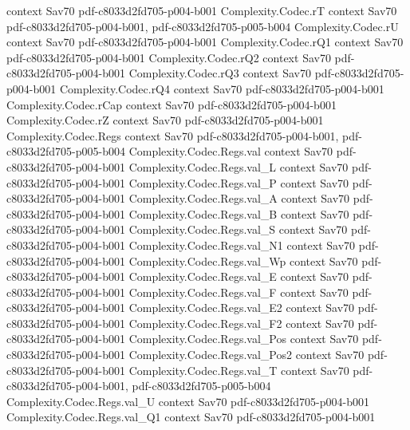 \begin{theorem}
  {context}
  {Sav70}
  {pdf-c8033d2fd705-p004-b001}
\proofstep
  {Complexity.Codec.rT}
  {context}
  {Sav70}
  {pdf-c8033d2fd705-p004-b001,
    pdf-c8033d2fd705-p005-b004}
\proofstep
  {Complexity.Codec.rU}
  {context}
  {Sav70}
  {pdf-c8033d2fd705-p004-b001}
\proofstep
  {Complexity.Codec.rQ1}
  {context}
  {Sav70}
  {pdf-c8033d2fd705-p004-b001}
\proofstep
  {Complexity.Codec.rQ2}
  {context}
  {Sav70}
  {pdf-c8033d2fd705-p004-b001}
\proofstep
  {Complexity.Codec.rQ3}
  {context}
  {Sav70}
  {pdf-c8033d2fd705-p004-b001}
\proofstep
  {Complexity.Codec.rQ4}
  {context}
  {Sav70}
  {pdf-c8033d2fd705-p004-b001}
\proofstep
  {Complexity.Codec.rCap}
  {context}
  {Sav70}
  {pdf-c8033d2fd705-p004-b001}
\proofstep
  {Complexity.Codec.rZ}
  {context}
  {Sav70}
  {pdf-c8033d2fd705-p004-b001}
\proofstep
  {Complexity.Codec.Regs}
  {context}
  {Sav70}
  {pdf-c8033d2fd705-p004-b001,
    pdf-c8033d2fd705-p005-b004}
\proofstep
  {Complexity.Codec.Regs.val}
  {context}
  {Sav70}
  {pdf-c8033d2fd705-p004-b001}
\proofstep
  {Complexity.Codec.Regs.val_L}
  {context}
  {Sav70}
  {pdf-c8033d2fd705-p004-b001}
\proofstep
  {Complexity.Codec.Regs.val_P}
  {context}
  {Sav70}
  {pdf-c8033d2fd705-p004-b001}
\proofstep
  {Complexity.Codec.Regs.val_A}
  {context}
  {Sav70}
  {pdf-c8033d2fd705-p004-b001}
\proofstep
  {Complexity.Codec.Regs.val_B}
  {context}
  {Sav70}
  {pdf-c8033d2fd705-p004-b001}
\proofstep
  {Complexity.Codec.Regs.val_S}
  {context}
  {Sav70}
  {pdf-c8033d2fd705-p004-b001}
\proofstep
  {Complexity.Codec.Regs.val_N1}
  {context}
  {Sav70}
  {pdf-c8033d2fd705-p004-b001}
\proofstep
  {Complexity.Codec.Regs.val_Wp}
  {context}
  {Sav70}
  {pdf-c8033d2fd705-p004-b001}
\proofstep
  {Complexity.Codec.Regs.val_E}
  {context}
  {Sav70}
  {pdf-c8033d2fd705-p004-b001}
\proofstep
  {Complexity.Codec.Regs.val_F}
  {context}
  {Sav70}
  {pdf-c8033d2fd705-p004-b001}
\proofstep
  {Complexity.Codec.Regs.val_E2}
  {context}
  {Sav70}
  {pdf-c8033d2fd705-p004-b001}
\proofstep
  {Complexity.Codec.Regs.val_F2}
  {context}
  {Sav70}
  {pdf-c8033d2fd705-p004-b001}
\proofstep
  {Complexity.Codec.Regs.val_Pos}
  {context}
  {Sav70}
  {pdf-c8033d2fd705-p004-b001}
\proofstep
  {Complexity.Codec.Regs.val_Pos2}
  {context}
  {Sav70}
  {pdf-c8033d2fd705-p004-b001}
\proofstep
  {Complexity.Codec.Regs.val_T}
  {context}
  {Sav70}
  {pdf-c8033d2fd705-p004-b001,
    pdf-c8033d2fd705-p005-b004}
\proofstep
  {Complexity.Codec.Regs.val_U}
  {context}
  {Sav70}
  {pdf-c8033d2fd705-p004-b001}
\proofstep
  {Complexity.Codec.Regs.val_Q1}
  {context}
  {Sav70}
  {pdf-c8033d2fd705-p004-b001}
\proofstep

\end{theorem}
